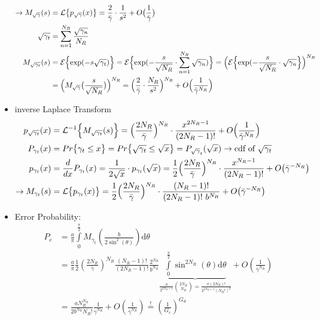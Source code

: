 \documentclass[a4paper, 10pt]{article}
\begin{document}
\begin{itemize}
\begin{align*}
		\rightarrow M_{\sqrt{\gamma}}(s) &= \mathcal{L}\bigl\{p_{\sqrt{\gamma}}(x)\bigr\} = \frac{2}{\bar{\gamma}}\cdot \frac{1}{s^2} + O\bigl(\frac{1}{\bar{\gamma}}\bigr)\\
		\sqrt{\gamma _t} &= \sum_{n = 1}^{N_R}\frac{\sqrt{\gamma _n}}{N_R}\\
		 M_{\sqrt{\gamma _t}}(s) &= \mathcal{E}\Bigl\{\mathrm{exp}({-s\sqrt{\gamma _t}})\Bigr\} = \mathcal{E}\Bigl\{\mathrm{exp}({-\frac{s}{\sqrt{N_R}}\cdot \sum_{n = 1}^{N_R}\sqrt{\gamma _n}})\Bigr\} = \Bigl(\mathcal{E}\Bigl\{\mathrm{exp}(-\frac{s}{\sqrt{N_R}}\cdot \sqrt{\gamma _n}\Bigr\}\Bigr)^{N_R}\\
		 &= \Bigl( M_{\sqrt{\gamma}}\bigl(\frac{s}{\sqrt{N_R}}\bigr) \Bigr)^{N_R} = \Bigl(\frac{2}{\bar{\gamma}}\cdot \frac{N_R}{s^2}\Bigr)^{N_R} + O\Bigl(\frac{1}{\bar{\gamma}^{N_R}}\Bigr)\\
	\end{align*}
	\item inverse Laplace Transform
	\begin{align*}
		p_{\sqrt{\gamma _t}}(x) &= \mathcal{L} ^{-1}\Bigl\{M_{\sqrt{\gamma _t}}(s)\Bigr\} = \Bigl(\frac{2N_R}{\bar{\gamma}}\Bigr)^{N_R}\cdot \frac{x^{2N_R-1}}{(2N_R-1)!} + O\Bigl(	\frac{1}{\bar{\gamma}^{N_R}}\Bigr)\\
		P_{\gamma _t}(x) &= Pr\bigl\{\gamma _t\leq x	\bigr\} =  Pr\bigl\{\sqrt{\gamma _t}\leq \sqrt{x}\bigr\} = P_{\sqrt\gamma _t}(\sqrt{x}) \rightarrow \text{cdf of } \sqrt{\gamma _t}\\
		p_{\gamma _t}(x) &= \frac{d}{dx}P_{\gamma _t}(x) = \frac{1}{2\sqrt{x}}\cdot p_{\gamma _t}(\sqrt{x}) = \frac{1}{2}\Bigl(\frac{2N_R}{\bar{\gamma}} \Bigr)^{N_R}\cdot \frac{x^{N_R-1}}{(2N_R-1)!} + O\bigl(\bar{\gamma}^{-N_R}\bigr)\\
		\rightarrow M_{\gamma _t}(s) &= \mathcal{L}\bigl\{p_{\gamma _t}(x)\bigr\} = \frac{1}{2}\Bigl( \frac{2N_R}{\bar{\gamma}}\Bigr)^{N_R}\cdot \frac{(N_R - 1)!}{(2N_R -1)!~b^{N_R}} + O\bigl(\bar{\gamma}^{-N_R}\bigr)\\
	\end{align*}
	\item Error Probability:
\begin{align*}
        P_e&=\frac{a}{\pi}\int\limits_0^{\frac{\pi}{2}}M_{\gamma_t}\left(\frac{b}{2\sin^2(\theta)}\right)\mathrm{d}\theta\\
        &=\frac{a}{\pi}\frac{1}{2}\left(\frac{2N_R}{\bar{\gamma}}\right)^{N_R}\frac{(N_R-1)!}{(2N_R-1)!}
        \frac{2^{N_R}}{b^{N_R}}
        \underbrace{\int\limits_0^{\frac{\pi}{2}}\sin^{2N_R}(\theta)\mathrm{d}\theta}_
        {\frac{\pi}{2^{2N_R+1}}\binom{2N_R}{N_R}=\frac{\pi(2N_R)!}{2^{2N_R+1}(N_R!)^2}}
        +O\left(\frac{1}{\bar{\gamma}^{N_R}}\right)\\
        &= \frac{aN_R^{N_R}}{2b^{N_R}N_R!}\frac{1}{\bar{\gamma}^{N_R}}+O\left(\frac{1}{\bar{\gamma}^{N_R}}\right)
        \overset{!}{=}\left(\frac{1}{G_c}\right)^{G_d}
\end{align*}


\end{itemize}
\end{document}
